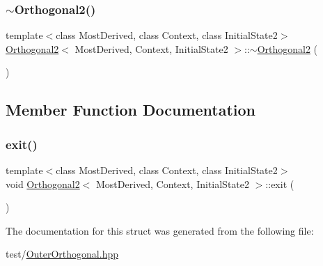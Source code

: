 \mbox{\label{struct_orthogonal2_af68941e005d69423e7d1b4e142d247ed}} 
\subsubsection{\texorpdfstring{$\sim$\+Orthogonal2()}{~Orthogonal2()}}
{\footnotesize\ttfamily template$<$class Most\+Derived, class Context, class Initial\+State2$>$ \\
\mbox{\hyperlink{struct_orthogonal2}{Orthogonal2}}$<$ Most\+Derived, Context, Initial\+State2 $>$\+::$\sim$\mbox{\hyperlink{struct_orthogonal2}{Orthogonal2}} (\begin{DoxyParamCaption}{ }\end{DoxyParamCaption})\hspace{0.3cm}{\ttfamily [inline]}}



\subsection{Member Function Documentation}
\mbox{\label{struct_orthogonal2_a0c721d40bb642f3c7506ca095661ee3d}} 
\subsubsection{\texorpdfstring{exit()}{exit()}}
{\footnotesize\ttfamily template$<$class Most\+Derived, class Context, class Initial\+State2$>$ \\
void \mbox{\hyperlink{struct_orthogonal2}{Orthogonal2}}$<$ Most\+Derived, Context, Initial\+State2 $>$\+::exit (\begin{DoxyParamCaption}{ }\end{DoxyParamCaption})\hspace{0.3cm}{\ttfamily [inline]}}



The documentation for this struct was generated from the following file\+:\begin{DoxyCompactItemize}
\item 
test/\mbox{\hyperlink{_outer_orthogonal_8hpp}{Outer\+Orthogonal.\+hpp}}\end{DoxyCompactItemize}
